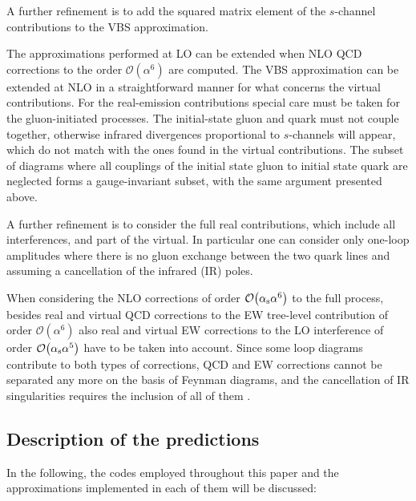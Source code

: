 \documentclass[twocolumn,epjc3]{svjour3} %
\begin{document}
    A further refinement is to add the squared matrix element of the $s$-channel contributions to the VBS approximation.

    The approximations performed at LO can be extended when NLO QCD corrections to the order $\mathcal{O}{\left(\alpha^{6}\right)}$ are computed.
    The VBS approximation can be extended at NLO in a straightforward manner for what concerns the virtual contributions.
    For the real-emission contributions special care must be taken for the gluon-initiated processes.
    The initial-state gluon and quark 
        must not couple together, otherwise infrared divergences proportional to $s$-channels will appear, 
         which do not match with the ones found in the virtual contributions.
         The subset of diagrams where all couplings of the initial state gluon to initial state quark are neglected forms a gauge-invariant subset, with the same argument presented above.

    A further refinement is to consider the full real contributions, which include all interferences, and part of the virtual.
    In particular one can consider only one-loop amplitudes where there is no gluon exchange between the two quark lines and 
    assuming a cancellation of the infrared (IR) poles.

    When considering the NLO corrections of order
    $\mathcal{O}{\left(\alpha_{\rm s}\alpha^{6}\right)}$
    to the full process, besides real and virtual QCD corrections
    to the EW tree-level contribution of order
    $\mathcal{O}{\left(\alpha^{6}\right)}$
    also real and virtual EW corrections to the LO interference
    of order $\mathcal{O}{\left(\alpha_{\rm s}\alpha^{5}\right)}$
    have to be taken into account. Since some loop diagrams contribute
    to both types of corrections, QCD and EW corrections cannot be
    separated any more on the basis of Feynman diagrams, and the
    cancellation of IR singularities requires the inclusion of all of them \cite{Biedermann:2017bss}.
    \subsection{Description of the predictions}
        \label{subsec:codedescr}
    In the following, the codes employed throughout this paper and the approximations implemented in each of them will be discussed:
\end{document}
